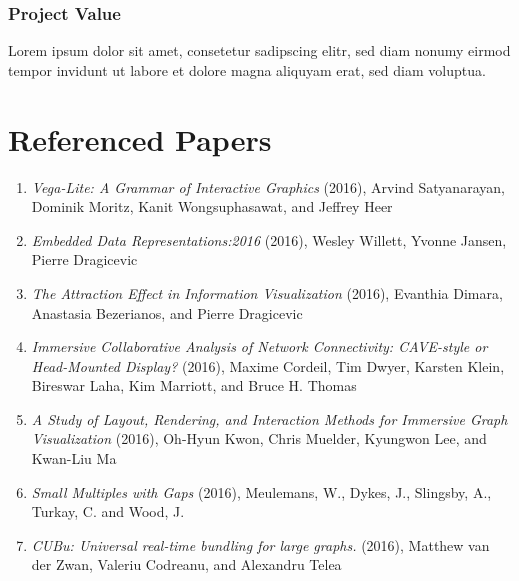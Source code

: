 \documentclass[journal]{vgtc}                %
\begin{document}
        \subsubsection{Project Value}
        Lorem ipsum dolor sit amet, consetetur sadipscing elitr, sed diam nonumy eirmod tempor invidunt ut labore et dolore magna aliquyam erat, sed diam voluptua.

\section{Referenced Papers}
    \begin{enumerate}
        \item{\textit{Vega-Lite: A Grammar of Interactive Graphics} (2016), Arvind Satyanarayan, Dominik Moritz, Kanit Wongsuphasawat, and Jeffrey Heer \cite{VegaLite:2016}}
        \item{\textit{Embedded Data Representations:2016} (2016), Wesley Willett, Yvonne Jansen, Pierre Dragicevic \cite{EmbeddedDataRepresentations:2016}}
        \item{\textit{The Attraction Effect in Information Visualization} (2016), Evanthia Dimara, Anastasia Bezerianos, and Pierre Dragicevic \cite{AttractionEffect:2016}}
        \item{\textit{Immersive Collaborative Analysis of Network Connectivity: CAVE-style or Head-Mounted Display?} (2016), Maxime Cordeil{,} Tim Dwyer{,} Karsten Klein{,} Bireswar Laha{,} Kim Marriott{,} and Bruce H. Thomas \cite{NetworkConnectivityAnalysis:2016}}
        \item{\textit{A Study of Layout, Rendering, and Interaction Methods for Immersive Graph Visualization} (2016), Oh-Hyun Kwon{,} Chris Muelder{,} Kyungwon Lee{,} and Kwan-Liu Ma \cite{ImmersiveGraphVisualization:2016}}
        \item{\textit{Small Multiples with Gaps} (2016), Meulemans{,} W.{,} Dykes{,} J.{,} Slingsby{,} A.{,} Turkay{,} C. and Wood{,} J. \cite{SmallMultiples:2016}}
        \item{\textit{CUBu: Universal real-time bundling for large graphs.} (2016), Matthew van der Zwan{,} Valeriu Codreanu{,} and Alexandru Telea \cite{CUBu:2016}}
    \end{enumerate}




\nocite{*}
%
%
%

%


\end{document}
